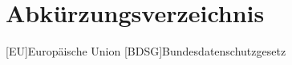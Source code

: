 \clearpage
\chapter*{Abkürzungsverzeichnis}	


\begin{acronym}[RDBMS]
	[EU]{Europäische Union}
	[BDSG]{Bundesdatenschutzgesetz}
\end{acronym}
